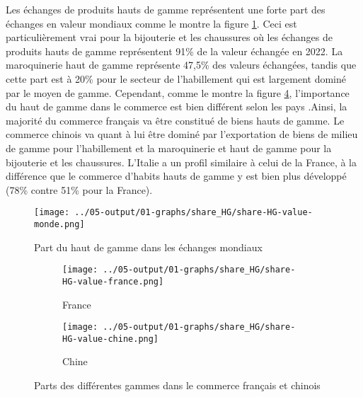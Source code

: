 \documentclass[french,10pt,a4paper]{article}
\begin{document}
Les échanges de produits hauts de gamme représentent une forte part des échanges en valeur mondiaux comme le montre la figure \ref{fig:share-HG-value-monde}. Ceci est particulièrement vrai pour la bijouterie et les chaussures où les échanges de produits hauts de gamme représentent 91\% de la valeur échangée en 2022. La maroquinerie haut de gamme représente 47,5\% des valeurs échangées, tandis que cette part est à 20\% pour le secteur de l'habillement qui est largement dominé par le moyen de gamme. Cependant, comme le montre la figure \ref{fig:share-HG-value-france-chine}, l'importance du haut de gamme dans le commerce est bien différent selon les pays .Ainsi, la majorité du commerce français va être constitué de biens hauts de gamme. Le commerce chinois va quant à lui être dominé par l'exportation de biens de milieu de gamme pour l'habillement et la maroquinerie et haut de gamme pour la bijouterie et les chaussures. L'Italie a un profil similaire à celui de la France, à la différence que le commerce d'habits hauts de gamme y est bien plus développé (78\% contre 51\% pour la France). 

\begin{figure}[!h]
  \centering
  \texttt{[image: ../05-output/01-graphs/share\_HG/share-HG-value-monde.png]}
  \caption{Part du haut de gamme dans les échanges mondiaux}
  \label{fig:share-HG-value-monde}
\end{figure}


\begin{figure}[!h]
  \centering
  \begin{subfigure}{\textwidth}
    \centering    
    \texttt{[image: ../05-output/01-graphs/share\_HG/share-HG-value-france.png]}
    \caption{France}
    \label{fig:share-HG-value-france}
  \end{subfigure}
  \vspace{0.5cm}
  \begin{subfigure}{\textwidth}
    \centering
 \texttt{[image: ../05-output/01-graphs/share\_HG/share-HG-value-chine.png]}
 \caption{Chine}
 \label{fig:share-HG-value-chine}
  \end{subfigure}
  \caption{Parts des différentes gammes dans le commerce français et chinois}
  \label{fig:share-HG-value-france-chine}
\end{figure}


\newpage


\end{document}
